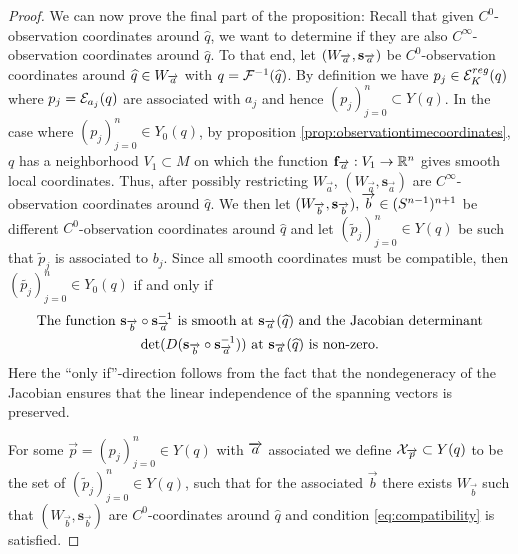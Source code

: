 \begin{proof}
    We can now prove the final part of the proposition: Recall that given $C^0$-observation coordinates around $\widehat{q}$, we want to determine if they are also $C^\infty$-observation coordinates around $\widehat{q}$.
    To that end, let $(W_\aa,\mathbf{s}_\aa)$ be $C^0$-observation coordinates around $\widehat{q}\in W_\aa$ with $q=\F^{-1}(\widehat{q})$. By definition we have $p_j\in \er(q)$ where $p_j=\mc{E}_{a_j}(q)$ are associated with $a_j$ and hence $(p_j)_{j=0}^n\subset Y(q)$. In the case where $(p_j)^n_{j=0}\in Y_0(q)$, by proposition \ref{prop:observationtimecoordinates}, $q$ has a neighborhood $V_1\subset M$ on which the function $\mathbf{f}_{\overrightarrow{a}}:V_1\to\R^n$ gives smooth local coordinates. Thus, after possibly restricting $W_{\overrightarrow{a}}$, $(W_{\overrightarrow{a}},\mathbf{s}_{\overrightarrow{a}})$ are $C^\infty$-observation coordinates around $\widehat{q}$. 
    We then let $(W_{\overrightarrow{b}},\mathbf{s}_{\overrightarrow{b}}), \overrightarrow{b}\in (\sn)^{n+1}$ be different $C^0$-observation coordinates around $\widehat{q}$ and let $(\widetilde{p}_j)^n_{j=0}\in Y(q)$ be such that $\widetilde{p}_j$ is associated to $b_j$.
    Since all smooth coordinates must be compatible, then $(\widetilde{p_j})^n_{j=0}\in Y_0(q)$ if and only if 
    \begin{multline}\label{eq:compatibility}
        \text{The function $\mathbf{s}_{\overrightarrow{b}}\circ \mathbf{s}_{\aa}^{-1}$ is smooth at $\mathbf{s}_{\overrightarrow{a}}(\widehat{q})$ and the Jacobian determinant}\\
        \det(D(\mathbf{s}_{\overrightarrow{b}}\circ \mathbf{s}_{\overrightarrow{a}}^{-1}))\text{ at } \mathbf{s}_{\overrightarrow{a}}(\widehat{q})\text{ is non-zero.}
    \end{multline}
    Here the \enquote{only if}-direction follows from the fact that the nondegeneracy of the Jacobian ensures that the linear independence of the spanning vectors is preserved.
    
    For some $\overrightarrow{p}=(p_j)^n_{j=0}\in Y(q)$ with $\aa$ associated we define $\mc{X}_{\overrightarrow{p}}\subset Y(q)$ to be the set of $(\widetilde{p}_j)^n_{j=0}\in Y(q)$, such that for the associated $\overrightarrow{b}$ there exists $W_{\overrightarrow{b}}$ such that $(W_{\overrightarrow{b}},\mathbf{s}_{\overrightarrow{b}})$ are $C^0$-coordinates around $\widehat{q}$ and condition \eqref{eq:compatibility} is satisfied.
    

\end{proof}
